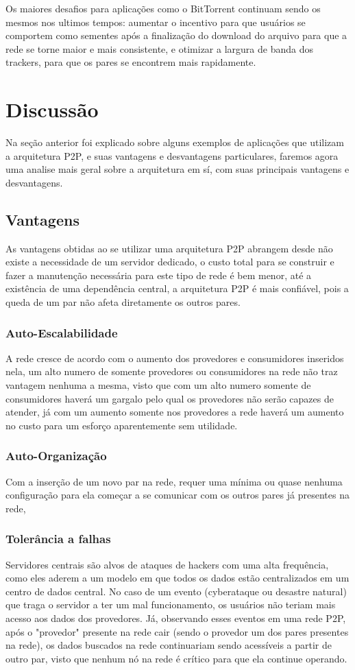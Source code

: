 \documentclass[a4paper]{article}
\begin{document}
Os maiores desafios para aplicações como o BitTorrent continuam sendo os mesmos nos ultimos tempos: aumentar o incentivo para que usuários se comportem como sementes após a finalização do download do arquivo para que a rede se torne maior e mais consistente,  e otimizar a largura de banda dos trackers, para que os pares se encontrem mais rapidamente.

\newpage

\section{Discussão}
Na seção anterior foi explicado sobre alguns exemplos de aplicações que utilizam a arquitetura P2P, e suas vantagens e desvantagens particulares, faremos agora uma analise mais geral sobre a arquitetura em sí, com suas principais vantagens e desvantagens.

\subsection{Vantagens}
As vantagens obtidas ao se utilizar uma arquitetura P2P abrangem desde não existe a necessidade de um servidor dedicado, o custo total para se construir e fazer a manutenção necessária para este tipo de rede é bem menor, até a existência de uma dependência central, a arquitetura P2P é mais confiável, pois a queda de um par não afeta diretamente os outros pares.
\subsubsection{Auto-Escalabilidade}
A rede cresce de acordo com o aumento dos provedores e consumidores inseridos nela, um alto numero de somente provedores ou consumidores na rede não traz vantagem nenhuma a mesma, visto que com um alto numero somente de consumidores haverá um gargalo pelo qual os provedores não serão capazes de atender, já com um aumento somente nos provedores a rede haverá um aumento no custo para um esforço aparentemente sem utilidade.\cite{ACohenBAD}
\subsubsection{Auto-Organização}
Com a inserção de um novo par na rede, requer uma mínima ou quase nenhuma configuração para ela começar a se comunicar com os outros pares já presentes na rede,\cite{ACohenBAD}
\subsubsection{Tolerância a falhas} 
Servidores centrais são alvos de ataques de hackers com uma alta frequência, como eles aderem a um modelo em que todos os dados estão centralizados em um centro de dados central. No caso de um evento (cyberataque ou desastre natural) que traga o servidor a ter um mal funcionamento, os usuários não teriam mais acesso aos dados dos provedores. Já, observando esses eventos em uma rede P2P, após o "provedor" presente na rede cair (sendo o provedor um dos pares presentes na rede), os dados buscados na rede continuariam sendo acessíveis a partir de outro par, visto que nenhum nó na rede é crítico para que ela continue operando.\cite{ACohenBAD}
\end{document}
